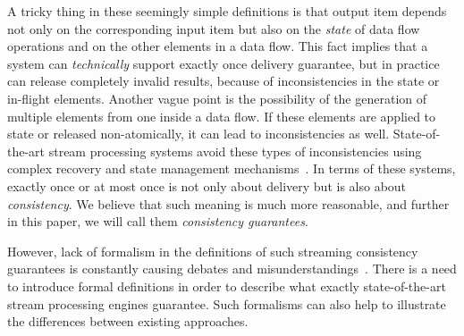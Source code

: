 \documentclass[sigconf]{acmart}
\theoremstyle{definition}
\begin{document}
A tricky thing in these seemingly simple definitions is that output item depends not only on the corresponding input item but also on the {\em state} of data flow operations and on the other elements in a data flow. This fact implies that a system can {\em technically} support exactly once delivery guarantee, but in practice can release completely invalid results, because of inconsistencies in the state or in-flight elements. Another vague point is the possibility of the generation of multiple elements from one inside a data flow. If these elements are applied to state or released non-atomically, it can lead to inconsistencies as well. State-of-the-art stream processing systems avoid these types of inconsistencies using complex recovery and state management mechanisms~\cite{Carbone:2017:SMA:3137765.3137777}. In terms of these systems, exactly once or at most once is not only about delivery but is also about {\em consistency}. We believe that such meaning is much more reasonable, and further in this paper, we will call them {\em consistency guarantees}.   

However, lack of formalism in the definitions of such streaming consistency guarantees is constantly causing debates and misunderstandings~\cite{JerryPengStreamIO, PaperTrail}. There is a need to introduce formal definitions in order to describe what exactly state-of-the-art stream processing engines guarantee. Such formalisms can also help to illustrate the differences between existing approaches.


\end{document}
